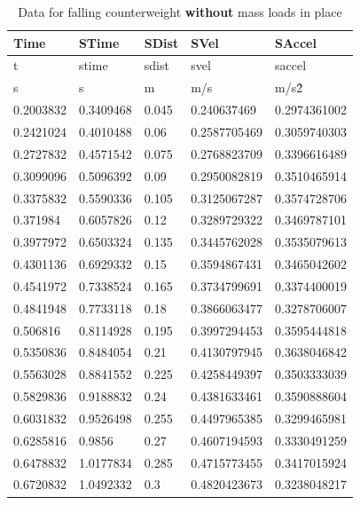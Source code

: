 \documentclass[coverpage]{article}
\begin{document}
	\begin{table}[!ht]
		\label{table:without-masses-table}
		\caption{Data for falling counterweight \textbf{without} mass loads in place}
		\vspace{.1in}
		
		\centering
		\begin{tabular}{|l|l|l|l|l|}
			Time & STime & SDist & SVel & SAccel \\ \hline
			t & stime & sdist & svel & saccel \\ \hline
			s & s & m & m/s & m/s\^2 \\ \hline
			0.2003832 & 0.3409468 & 0.045 & 0.240637469 & 0.2974361002 \\ \hline
			0.2421024 & 0.4010488 & 0.06 & 0.2587705469 & 0.3059740303 \\ \hline
			0.2727832 & 0.4571542 & 0.075 & 0.2768823709 & 0.3396616489 \\ \hline
			0.3099096 & 0.5096392 & 0.09 & 0.2950082819 & 0.3510465914 \\ \hline
			0.3375832 & 0.5590336 & 0.105 & 0.3125067287 & 0.3574728706 \\ \hline
			0.371984 & 0.6057826 & 0.12 & 0.3289729322 & 0.3469787101 \\ \hline
			0.3977972 & 0.6503324 & 0.135 & 0.3445762028 & 0.3535079613 \\ \hline
			0.4301136 & 0.6929332 & 0.15 & 0.3594867431 & 0.3465042602 \\ \hline
			0.4541972 & 0.7338524 & 0.165 & 0.3734799691 & 0.3374400019 \\ \hline
			0.4841948 & 0.7733118 & 0.18 & 0.3866063477 & 0.3278706007 \\ \hline
			0.506816 & 0.8114928 & 0.195 & 0.3997294453 & 0.3595444818 \\ \hline
			0.5350836 & 0.8484054 & 0.21 & 0.4130797945 & 0.3638046842 \\ \hline
			0.5563028 & 0.8841552 & 0.225 & 0.4258449397 & 0.3503333039 \\ \hline
			0.5829836 & 0.9188832 & 0.24 & 0.4381633461 & 0.3590888604 \\ \hline
			0.6031832 & 0.9526498 & 0.255 & 0.4497965385 & 0.3299465981 \\ \hline
			0.6285816 & 0.9856 & 0.27 & 0.4607194593 & 0.3330491259 \\ \hline
			0.6478832 & 1.0177834 & 0.285 & 0.4715773455 & 0.3417015924 \\ \hline
			0.6720832 & 1.0492332 & 0.3 & 0.4820423673 & 0.3238048217 \\ \hline

\end{tabular}
\end{table}
\end{document}
